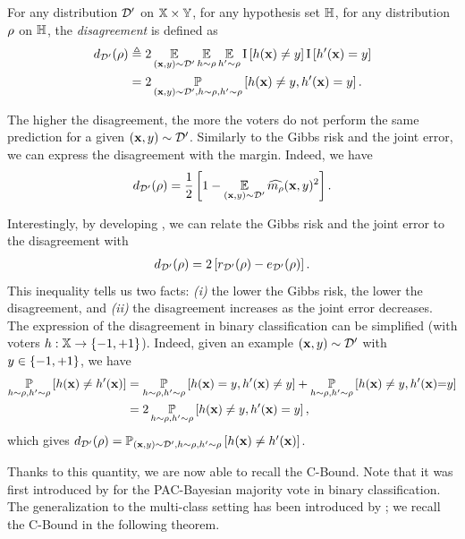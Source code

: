 \begin{definition}[Disagreement]\label{chap:pac-bayes:def:disagreement} For any distribution $\mathcal{D}'$ on $\mathbb{X}\times\mathbb{Y}$, for any hypothesis set $\mathbb{H}$, for any distribution $\rho$ on $\mathbb{H}$, the {\it disagreement} is defined as
\begin{align*}
    d_{\mathcal{D}'}(\rho) &\triangleq 2\operatorname*{\mathbb{E}}_{(\mathbf{x},y)\sim\mathcal{D}'}\operatorname*{\mathbb{E}}_{h\sim\rho}\operatorname*{\mathbb{E}}_{h'\sim\rho}\operatorname{I}\left[ h(\mathbf{x})\ne y\right]\operatorname{I}\left[ h'(\mathbf{x})=y\right]\\
    &= 2\operatorname*{\mathbb{P}}_{(\mathbf{x},y)\sim\mathcal{D}', h\sim\rho, h'\sim\rho}\left[ h(\mathbf{x})\ne y, h'(\mathbf{x})=y\right].
\end{align*}
\end{definition}

The higher the disagreement, the more the voters do not perform the same prediction for a given $(\mathbf{x},y)\sim\mathcal{D}'$.
Similarly to the Gibbs risk and the joint error, we can express the disagreement with the margin.
Indeed, we have
\begin{align}
    d_{\mathcal{D}'}(\rho) = \frac{1}{2}\left[ 1 - \operatorname*{\mathbb{E}}_{(\mathbf{x},y)\sim\mathcal{D}'}\widehat{m_{\rho}}(\mathbf{x},y)^2\right].\label{chap:pac-bayes:eq:disagreement-margin}
\end{align}

Interestingly, by developing , we can relate the Gibbs risk and the joint error to the disagreement with
\begin{align}
    d_{\mathcal{D}'}(\rho) = 2\left[ r_{\mathcal{D}'}(\rho) - e_{\mathcal{D}'}(\rho)\right].\label{chap:pac-bayes:eq:disagreement-risk-joint}
\end{align}
This inequality tells us two facts: {\it (i)} the lower the Gibbs risk, the lower the disagreement, and {\it (ii)} the disagreement increases as the joint error decreases.
The expression of the disagreement in binary classification can be simplified (with voters $h:\mathbb{X}\to \{-1, +1\}$).
Indeed, given an example $(\mathbf{x}, y)\sim\mathcal{D}'$ with $y\in\{-1, +1\}$, we have
\begin{align*}
    \operatorname*{\mathbb{P}}_{h\sim\rho, h'\sim\rho}\left[ h(\mathbf{x})\ne h'(\mathbf{x})\right] &= \operatorname*{\mathbb{P}}_{h\sim\rho, h'\sim\rho}\left[ h(\mathbf{x})=y, h'(\mathbf{x})\ne y \right] + \operatorname*{\mathbb{P}}_{h\sim\rho, h'\sim\rho}\left[ h(\mathbf{x})\ne y, h'(\mathbf{x}){=}y \right]\\
    &= 2\operatorname*{\mathbb{P}}_{h\sim\rho, h'\sim\rho}\left[ h(\mathbf{x})\ne y, h'(\mathbf{x})=y\right],
\end{align*}
which gives $d_{\mathcal{D}'}(\rho)=\operatorname*{\mathbb{P}}_{(\mathbf{x},y)\sim\mathcal{D}', h\sim\rho, h'\sim\rho}\left[ h(\mathbf{x})\ne h'(\mathbf{x})\right]$.

Thanks to this quantity, we are now able to recall the C-Bound.
Note that it was first introduced by \citet{LacasseLavioletteMarchandGermainUsunier2006} for the PAC-Bayesian majority vote in binary classification.
The generalization to the multi-class setting has been introduced by \citet[Theorem~2 and Corollary~1]{LavioletteMorvantRalaivolaRoy2017}; we recall the C-Bound in the following theorem.

